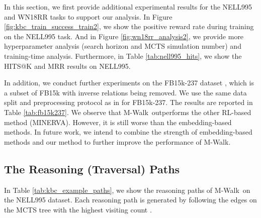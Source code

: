 \documentclass{article}
\newcommand{\modelname}{M-Walk}
\begin{document}
In this section, we first provide additional experimental results for the NELL995 and WN18RR tasks to support our analysis. In Figure \ref{fig:kbc_train_success_train2}, we show the positive reward rate during training on the NELL995 task. And in Figure \ref{fig:wn18rr_analysis2}, we provide more hyperparameter analysis (search horizon and MCTS simulation number) and training-time analysis. Furthermore, in Table \ref{tab:nell995_hits}, we show the HITS@K and MRR results on NELL995.
	
In addition, we conduct further experiments on the FB15k-237 dataset \cite{Kristinafb15k237}, which is a subset of FB15k \cite{bordes2013translating} with inverse relations being removed. We use the same data split and preprocessing protocol as in \cite{dettmers2018conve} for FB15k-237. The results are reported in Table \ref{tab:fb15k237}. We observe that \modelname~outperforms the other RL-based method (MINERVA). However, it is still worse than the embedding-based methods. In future work, we intend to combine the strength of embedding-based methods and our method to further improve the performance of \modelname.
	
	
	
	
\subsection{The Reasoning (Traversal) Paths}
\label{Appendix:three_glass_puzzle_paths}
In Table \ref{tab:kbc_example_paths}, we show the reasoning paths of \modelname~on the NELL995 dataset. Each reasoning path is generated by following the edges on the MCTS tree with the highest visiting count .
\end{document}
